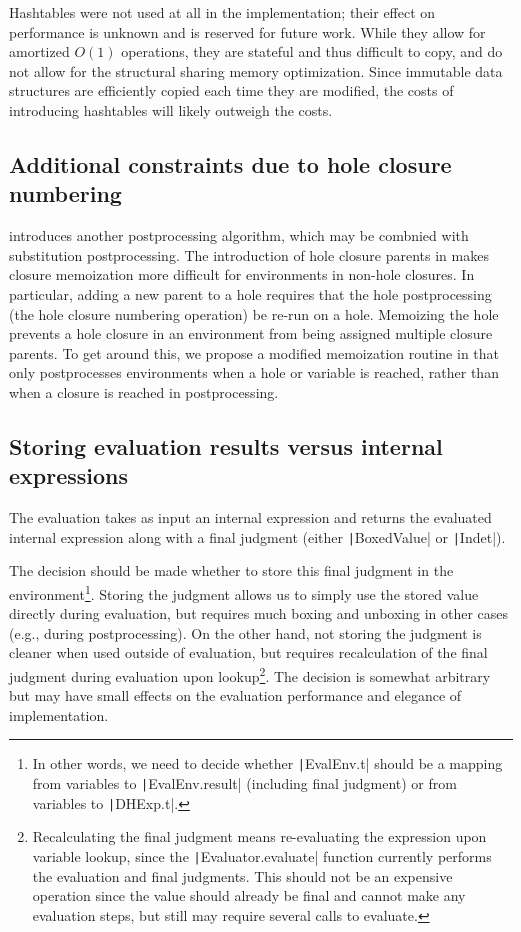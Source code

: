 Hashtables were not used at all in the implementation; their effect on performance is unknown and is reserved for future work. While they allow for amortized $O(1)$ operations, they are stateful and thus difficult to copy, and do not allow for the structural sharing memory optimization. Since immutable data structures are efficiently copied each time they are modified, the costs of introducing hashtables will likely outweigh the costs.

\subsection{Additional constraints due to hole closure numbering}
\label{sec:difficulties-hole-numbering}

 introduces another postprocessing algorithm, which may be combnied with substitution postprocessing. The introduction of hole closure parents in  makes closure memoization more difficult for environments in non-hole closures. In particular, adding a new parent to a hole requires that the hole postprocessing (the hole closure numbering operation) be re-run on a hole. Memoizing the hole prevents a hole closure in an environment from being assigned multiple closure parents. To get around this, we propose a modified memoization routine in  that only postprocesses environments when a hole or variable is reached, rather than when a closure is reached in postprocessing.

\subsection{Storing evaluation results versus internal expressions}
\label{sec:result-vs-dhexp}

The evaluation takes as input an internal expression and returns the evaluated internal expression along with a \textsf{final} judgment (either \texttt|BoxedValue| or \texttt|Indet|).

The decision should be made whether to store this \textsf{final} judgment in the environment\footnote{In other words, we need to decide whether \texttt|EvalEnv.t| should be a mapping from variables to \texttt|EvalEnv.result| (including \textsf{final} judgment) or from variables to \texttt|DHExp.t|.}. Storing the judgment allows us to simply use the stored value directly during evaluation, but requires much boxing and unboxing in other cases (e.g., during postprocessing). On the other hand, not storing the judgment is cleaner when used outside of evaluation, but requires recalculation of the \textsf{final} judgment during evaluation upon lookup\footnote{Recalculating the \textsf{final} judgment means re-evaluating the expression upon variable lookup, since the \texttt|Evaluator.evaluate| function currently performs the evaluation and \textsf{final} judgments. This should not be an expensive operation since the value should already be final and cannot make any evaluation steps, but still may require several calls to evaluate.}. The decision is somewhat arbitrary but may have small effects on the evaluation performance and elegance of implementation.

